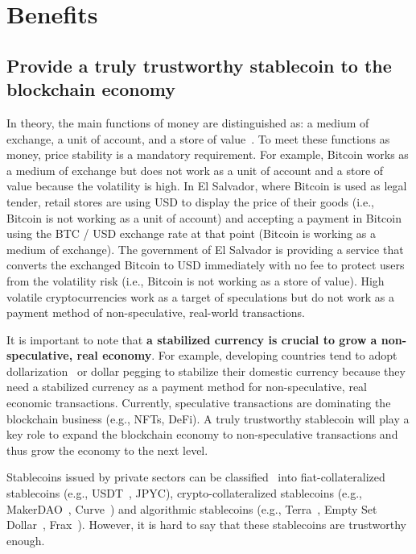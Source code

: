 \documentclass[dvipdfmx,a4paper]{article}
\begin{document}
\section{Benefits}

\subsection{Provide a truly trustworthy stablecoin to the blockchain economy}

In theory, the main functions of money are distinguished as: a medium of exchange, a unit of account, and a store of value~\cite{davies2010history,ferguson2008ascent}. To meet these functions as money, price stability is a mandatory requirement. For example, Bitcoin works as a medium of exchange but does not work as a unit of account and a store of value because the volatility is high. In El Salvador, where Bitcoin is used as legal tender, retail stores are using USD to display the price of their goods (i.e., Bitcoin is not working as a unit of account) and accepting a payment in Bitcoin using the BTC / USD exchange rate at that point (Bitcoin is working as a medium of exchange). The government of El Salvador is providing a service that converts the exchanged Bitcoin to USD immediately with no fee to protect users from the volatility risk (i.e., Bitcoin is not working as a store of value). High volatile cryptocurrencies work as a target of speculations but do not work as a payment method of non-speculative, real-world transactions.

It is important to note that \textbf{a stabilized currency is crucial to grow a non-speculative, real economy}. For example, developing countries tend to adopt dollarization~\cite{calvo2002dollarization,selgin2005currency} or dollar pegging to stabilize their domestic currency because they need a stabilized currency as a payment method for non-speculative, real economic transactions. Currently, speculative transactions are dominating the blockchain business (e.g., NFTs, DeFi). A truly trustworthy stablecoin will play a key role to expand the blockchain economy to non-speculative transactions and thus grow the economy to the next level.

Stablecoins issued by private sectors can be classified~\cite{arner2020stablecoins,moin2020sok} into fiat-collateralized stablecoins (e.g., USDT~\cite{tether}, JPYC), crypto-collateralized stablecoins (e.g., MakerDAO~\cite{makerdao}, Curve~\cite{curve}) and algorithmic stablecoins (e.g., Terra~\cite{terra}, Empty Set Dollar~\cite{emptysetdollar}, Frax~\cite{frax}). However, it is hard to say that these stablecoins are trustworthy enough.
\end{document}
